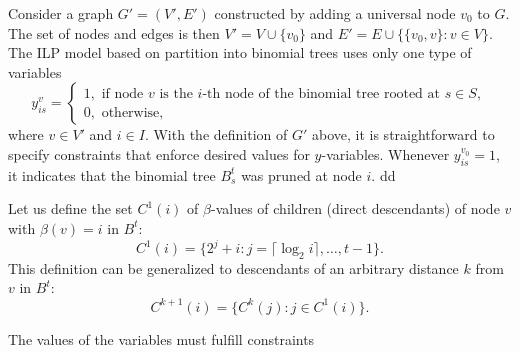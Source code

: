 Consider a graph $G'=(V',E')$ constructed  by adding a universal node $v_0$ to $G$. 
The set of nodes and edges is then $V'=V\cup \{v_0\}$ and $E'=E\cup\{\{v_0,v\}:v\in V\}$.
The ILP model based on partition into binomial trees uses only one type of variables
$$
y_{is}^v=\begin{cases}
1, \text{ if  node } v \text{ is the } i\text{-th node of the binomial tree rooted at } s\in S,\\
0, \text{ otherwise},
\end{cases}
$$
where $v\in V'$ and $i\in I $. 
With the definition of $G'$ above, it is straightforward to specify constraints that enforce desired values for $y$-variables.
Whenever $y_{is}^{v_0}=1$, it indicates that the binomial tree $B^t_s$ was pruned at node $i$.
dd%

Let us define the set $C^1(i)$ of $\beta$-values of children (direct descendants) of node $v$ with $\beta(v)=i$ in $B^t$:
\begin{equation}
C^1(i)=\{2^j+i:j=\lceil\log_2 i\rceil,\dots,t-1\}.
\end{equation}
This definition can be generalized to descendants of an arbitrary distance $k$ from $v$ in $B^t$:
\begin{equation}
C^{k+1}(i)=\{C^k(j):j\in C^1(i)\}.
\end{equation}

The values of the variables must fulfill constraints

